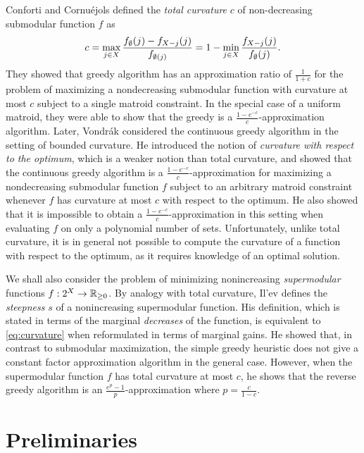 \documentclass{article}
\newcommand{\reals}{\ensuremath{\mathbb{R}}}
\newcommand{\posreals}{\ensuremath{\reals_{\ge 0}}}
\theoremstyle{definition}
\begin{document}
Conforti and Cornu\'{e}jols \cite{Conforti1984} defined the \emph{total curvature} $c$ of non-decreasing submodular function $f$ as
\begin{equation}
\label{eq:curvature}
c = \max_{j \in X}\frac{f_{\emptyset}(j) - f_{X - j}(j)}{f_{\emptyset(j)}}
= 1 - \min_{j \in X} \frac{f_{X-j}(j)}{f_{\emptyset}(j)}.
\end{equation}
They showed that greedy algorithm has an approximation ratio of $\frac{1}{1+c}$ for the problem of maximizing a nondecreasing submodular function with curvature at most $c$ subject to a single matroid constraint.  In the special case of a uniform matroid, they were able to show that the greedy is a $\frac{1 - e^{-c}}{c}$-approximation algorithm.  Later, Vondr\'{a}k \cite{Vondrak2010} considered the continuous greedy algorithm in the setting of bounded curvature.  He introduced the notion of \emph{curvature with respect to the optimum}, which is a weaker notion than total curvature, and showed that the continuous greedy algorithm is a $\frac{1 - e^{-c}}{c}$-approximation for maximizing a nondecreasing submodular function $f$ subject to an arbitrary matroid constraint whenever $f$ has curvature at most $c$ with respect to the optimum.  He also showed that it is impossible to obtain a $\frac{1 - e^{-c}}{c}$-approximation in this setting when evaluating $f$ on only a polynomial number of sets.  Unfortunately, unlike total curvature, it is in general not possible to compute the curvature of a function with respect to the optimum, as it requires knowledge of an optimal solution.

We shall also consider the problem of minimizing nonincreasing \emph{supermodular} functions $f : 2^{\ground} \to \posreals$.  By analogy with total curvature, Il'ev \cite{Ilev2001} defines the \emph{steepness} $s$ of a nonincreasing supermodular function.  His definition, which is stated in terms of the marginal \emph{decreases} of the function, is equivalent to \eqref{eq:curvature} when reformulated in terms of marginal gains.  He showed that, in contrast to submodular maximization, the simple  greedy heuristic does not give a constant factor approximation algorithm in the general case.  However, when the supermodular function $f$ has total curvature at most $c$, he shows that the reverse greedy algorithm is an $\frac{e^{p}-1}{p}$-approximation where $p = \frac{c}{1-c}$.

\section{Preliminaries}
\label{sec:preliminaries}
\end{document}
